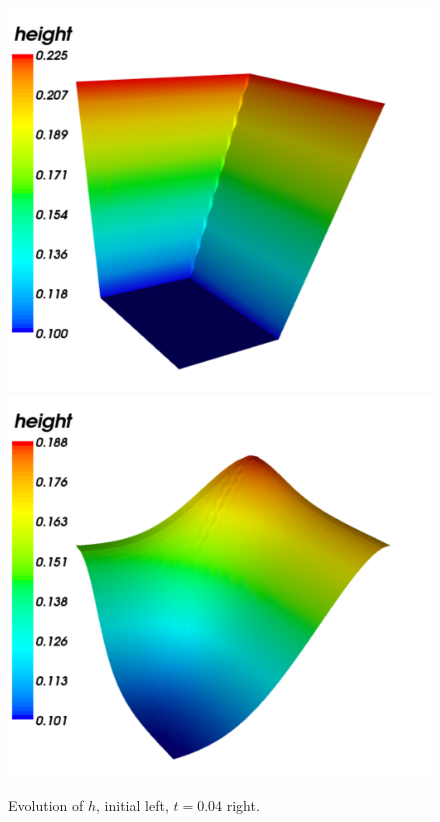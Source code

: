 \begin{figure}
  \begin{center}
    \includegraphics[width=\smallfig]{chapters/schroll/pdf/h0_typical.pdf}
    \includegraphics[width=\smallfig]{chapters/schroll/pdf/h_typical.pdf} \\
    \caption{Evolution of $h$, initial left, $t=0.04$ right.}
    \label{fig1}
  \end{center}
\end{figure}

